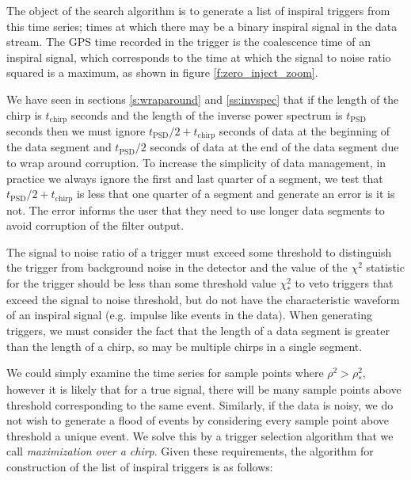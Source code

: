 The object of the search algorithm is to generate a list of inspiral triggers
from this time series; times at which there may be a binary inspiral signal in
the data stream. The GPS time recorded in the trigger is the coalescence time of
an inspiral signal, which corresponds to the time at which the signal to noise
ratio squared is a maximum, as shown in figure \ref{f:zero_inject_zoom}.

We have seen in sections \ref{s:wraparound} and \ref{ss:invspec} that if the
length of the chirp is $t_\mathrm{chirp}$ seconds and the length of the
inverse power spectrum is $t_\mathrm{PSD}$ seconds then we must ignore
$t_\mathrm{PSD}/2 + t_\mathrm{chirp}$ seconds of data at the beginning of the
data segment and $t_\mathrm{PSD}/2$ seconds of data at the end of the data
segment due to wrap around corruption. To increase the simplicity of data
management, in practice we always ignore the first and last quarter of a
segment, we test that $t_\mathrm{PSD}/2 + t_\mathrm{chirp}$ is less that one
quarter of a segment and generate an error is it is not. The error informs the
user that they need to use longer data segments to avoid corruption of the
filter output.

The signal to noise ratio of a trigger must exceed some threshold to
distinguish the trigger from background noise in the detector and the value of
the $\chi^2$ statistic for the trigger should be less than some threshold
value $\chi^2_\ast$ to veto triggers that exceed the signal to noise
threshold, but do not have the characteristic waveform of an inspiral signal
(e.g. impulse like events in the data).   When generating triggers, we must
consider the fact that the length of a data segment is greater than the length
of a chirp, so may be multiple chirps in a single segment.

We could simply examine the time series for sample points where $\rho^2 >
\rho^2_\ast$, however it is likely that for a true signal, there will be many
sample points above threshold corresponding to the same event. Similarly, if
the data is noisy, we do not wish to generate a flood of events by considering
every sample point above threshold a unique event. We solve this by a trigger
selection algorithm that we call \emph{maximization over a chirp}. 
Given these requirements, the algorithm for construction of the list of
inspiral triggers is as follows:

